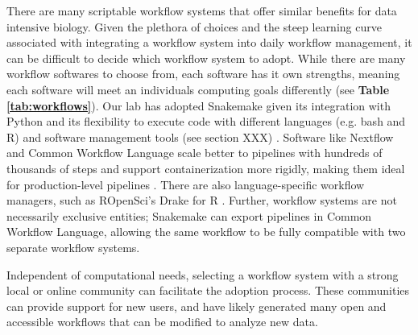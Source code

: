 \documentclass[10pt,letterpaper]{article}
\begin{document}
There are many scriptable workflow systems that offer similar benefits for data intensive biology. 
Given the plethora of choices and the steep learning curve associated with integrating a workflow system into daily workflow management, it can be difficult to decide which workflow system to adopt. 
While there are many workflow softwares to choose from, each software has it own strengths, meaning each software will meet an individuals computing goals differently (see \textbf{Table \ref{tab:workflows}}).
Our lab has adopted Snakemake given its integration with Python and its flexibility to execute code with different languages (e.g. bash and R) and software management tools (see section XXX) \cite{koster2012snakemake}.
Software like Nextflow and Common Workflow Language scale better to pipelines with hundreds of thousands of steps and support containerization more rigidly, making them ideal for production-level pipelines \cite{di2017nextflow, amstutz2016common}. 
There are also language-specific workflow managers, such as ROpenSci's Drake for R \cite{landau2018drake}. 
Further, workflow systems are not necessarily exclusive entities; Snakemake can export pipelines in Common Workflow Language, allowing the same workflow to be fully compatible with two separate workflow systems. 

\begin{table}
\caption{\label{tab:workflows} Popular bioinformatics workflow systems, documentation, and example workflows.}
\end{table}

Independent of computational needs, selecting a workflow system with a strong local or online community can facilitate the adoption process. 
These communities can provide support for new users, and have likely generated many open and accessible workflows that can be modified to analyze new data. 
\end{document}
